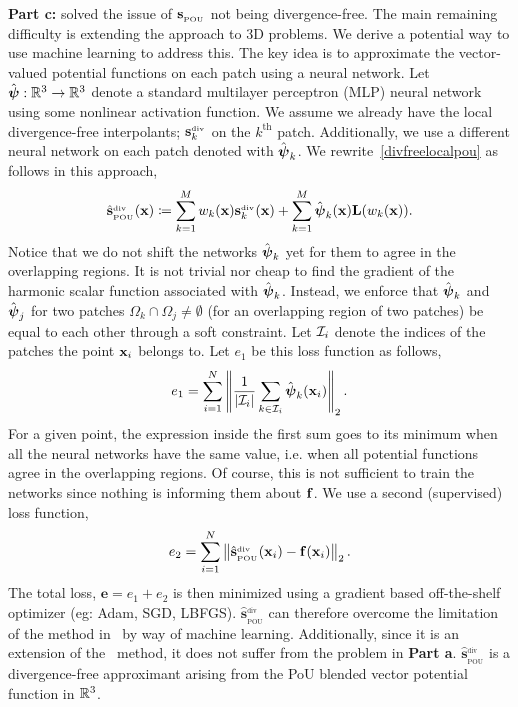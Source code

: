 {\bf Part c:} \citep{drake2021partition} solved the issue of $\mathbf{s}_{_{\text{POU}}}$ not being divergence-free. The main remaining difficulty is extending the approach to 3D problems. We derive a potential way to use machine learning to address this. The key idea is to approximate the vector-valued potential functions on each patch using a neural network. Let $\hat{\boldsymbol{\psi}}: \mathbb{R}^{3} \rightarrow \mathbb{R}^{3}$ denote a standard multilayer perceptron (MLP) neural network using some nonlinear activation function. We assume we already have the local divergence-free interpolants; $\mathbf{s}_k^{_{\text{div}}}$ on the $k^{\text{th}}$ patch. Additionally, we use a different neural network on each patch denoted with $\hat{\boldsymbol{\psi}}_k$. We rewrite~\eqref{divfreelocalpou} as follows in this approach,
\begin{align}
\hat{\mathbf{s}}^{_{\text{div}}}_{_{\text{POU}}}(\mathbf{x}) \coloneqq \sum\limits_{k=1}^{M} w_k(\mathbf{x}) \mathbf{s}_k^{_{\text{div}}}(\mathbf{x}) + \sum\limits_{k=1}^{M} \hat{\boldsymbol{\psi}}_k(\mathbf{x}) \mathbf{L}(w_k(\mathbf{x})). \label{divfreelocalpou_nn}
\end{align}
Notice that we do not shift the networks $\hat{\boldsymbol{\psi}}_k$ yet for them to agree in the overlapping regions. It is not trivial nor cheap to find the gradient of the harmonic scalar function associated with $\hat{\boldsymbol{\psi}}_k$. Instead, we enforce that $\hat{\boldsymbol{\psi}}_k$ and $\hat{\boldsymbol{\psi}}_j$ for two patches $\Omega_k \cap \Omega_j \neq \emptyset$ (for an overlapping region of two patches) be equal to each other through a soft constraint. Let $\mathcal{I}_i$ denote the indices of the patches the point $\mathbf{x}_i$ belongs to. Let $e_1$ be this loss function as follows,
\begin{align}
e_1 = \sum\limits_{i=1}^{N} \left\| \frac{1}{|\mathcal{I}_i|} \sum\limits_{k \in \mathcal{I}_i} \hat{\boldsymbol{\psi}}_k(\mathbf{x}_i) \right\|_2.
\end{align}
For a given point, the expression inside the first sum goes to its minimum when all the neural networks have the same value, i.e. when all potential functions agree in the overlapping regions. Of course, this is not sufficient to train the networks since nothing is informing them about $\mathbf{f}$. We use a second (supervised) loss function,
\begin{align}
e_2 = \sum\limits_{i=1}^{N} \left\| \hat{\mathbf{s}}^{_{\text{div}}}_{_{\text{POU}}}(\mathbf{x}_i) - \mathbf{f}(\mathbf{x}_i) \right\|_2.
\end{align}
The total loss, $\mathbf{e} = e_1 + e_2$ is then minimized using a gradient based off-the-shelf optimizer (eg: Adam, SGD, LBFGS). $\hat{\mathbf{s}}^{_{\text{div}}}_{_{\text{POU}}}$ can therefore overcome the limitation of the method in~\citep{drake2021partition} by way of machine learning. Additionally, since it is an extension of the~\citep{drake2021partition} method, it does not suffer from the problem in {\bf Part a}. $\hat{\mathbf{s}}^{_{\text{div}}}_{_{\text{POU}}}$ is a divergence-free approximant arising from the PoU blended vector potential function in $\mathbb{R}^3$.

